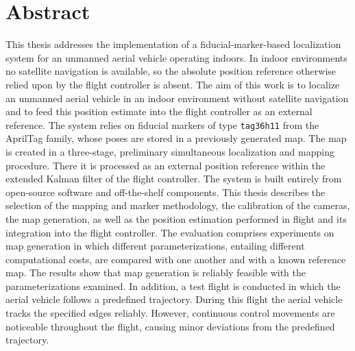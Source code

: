 \chapter*{Abstract}
\noindent
This thesis addresses the implementation of a fiducial-marker-based localization system for an unmanned aerial vehicle operating indoors.
In indoor environments no satellite navigation is available, so the absolute position reference otherwise relied upon by the flight controller is absent.
The aim of this work is to localize an unmanned aerial vehicle in an indoor environment without satellite navigation and to feed this position estimate into the flight controller as an external reference.
The system relies on fiducial markers of type \texttt{tag36h11} from the AprilTag family, whose poses are stored in a previously generated map.
The map is created in a three-stage, preliminary simultaneous localization and mapping procedure.
There it is processed as an external position reference within the extended Kalman filter of the flight controller.
The system is built entirely from open-source software and off-the-shelf components.
This thesis describes the selection of the mapping and marker methodology, the calibration of the cameras, the map generation, as well as the position estimation performed in flight and its integration into the flight controller.
The evaluation comprises experiments on map generation in which different parameterizations, entailing different computational costs, are compared with one another and with a known reference map.
The results show that map generation is reliably feasible with the parameterizations examined.
In addition, a test flight is conducted in which the aerial vehicle follows a predefined trajectory.
During this flight the aerial vehicle tracks the specified edges reliably.
However, continuous control movements are noticeable throughout the flight, causing minor deviations from the predefined trajectory.



